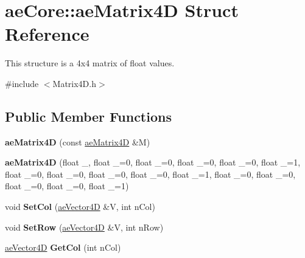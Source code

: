 \hypertarget{structae_core_1_1ae_matrix4_d}{}\section{ae\+Core\+:\+:ae\+Matrix4D Struct Reference}
\label{structae_core_1_1ae_matrix4_d}


This structure is a 4x4 matrix of float values.  




{\ttfamily \#include $<$Matrix4\+D.\+h$>$}

\subsection*{Public Member Functions}
\begin{DoxyCompactItemize}
\item 
{\bfseries ae\+Matrix4D} (const \hyperlink{structae_core_1_1ae_matrix4_d}{ae\+Matrix4D} \&M)\hypertarget{structae_core_1_1ae_matrix4_d_af0c3c5e4dba4307d7b6c2649f7aab147}{}\label{structae_core_1_1ae_matrix4_d_af0c3c5e4dba4307d7b6c2649f7aab147}

\item 
{\bfseries ae\+Matrix4D} (float \+\_, float \+\_=0, float \+\_=0, float \+\_=0, float \+\_=0, float \+\_=1, float \+\_=0, float \+\_=0, float \+\_=0, float \+\_=0, float \+\_=1, float \+\_=0, float \+\_=0, float \+\_=0, float \+\_=0, float \+\_=1)\hypertarget{structae_core_1_1ae_matrix4_d_a52021947986f57ba0370718b76a477b4}{}\label{structae_core_1_1ae_matrix4_d_a52021947986f57ba0370718b76a477b4}

\item 
void {\bfseries Set\+Col} (\hyperlink{structae_core_1_1ae_vector4_d}{ae\+Vector4D} \&V, int n\+Col)\hypertarget{structae_core_1_1ae_matrix4_d_a9123c9f143f27457b29743bb1d3d9a51}{}\label{structae_core_1_1ae_matrix4_d_a9123c9f143f27457b29743bb1d3d9a51}

\item 
void {\bfseries Set\+Row} (\hyperlink{structae_core_1_1ae_vector4_d}{ae\+Vector4D} \&V, int n\+Row)\hypertarget{structae_core_1_1ae_matrix4_d_acabfcac4822bf22577e906e995d34380}{}\label{structae_core_1_1ae_matrix4_d_acabfcac4822bf22577e906e995d34380}

\item 
\hyperlink{structae_core_1_1ae_vector4_d}{ae\+Vector4D} {\bfseries Get\+Col} (int n\+Col)\hypertarget{structae_core_1_1ae_matrix4_d_aafac06da90508d2c508a82cc5278f640}{}\label{structae_core_1_1ae_matrix4_d_aafac06da90508d2c508a82cc5278f640}


\end{DoxyCompactItemize}
